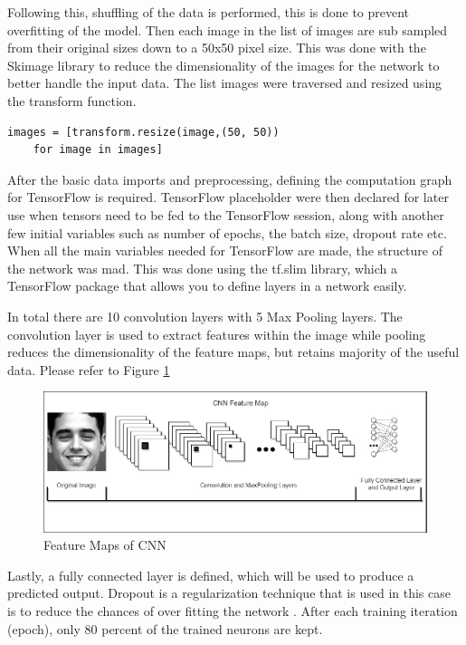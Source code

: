 Following this, shuffling of the data is performed, this is done to prevent overfitting of the model. Then each image in the list of images are sub sampled from their original sizes down to a 50x50 pixel size. This was done with the Skimage library to reduce the dimensionality of the images for the network to better handle the input data. The list images were traversed and resized using the transform function. 
\begin{lstlisting}[frame=single]
images = [transform.resize(image,(50, 50))
	for image in images]
\end{lstlisting}

After the basic data imports and preprocessing, defining the computation graph for TensorFlow is required. TensorFlow placeholder were then declared for later use when tensors need to be fed to the TensorFlow session, along with another few initial variables such as number of epochs, the batch size, dropout rate etc. When all the main variables needed for TensorFlow are made, the structure of the network was mad. This was done using the tf.slim library, which a TensorFlow package that allows you to define layers in a network easily. 

In total there are 10 convolution layers with 5 Max Pooling layers. The convolution layer is used to extract features within the image while pooling reduces the dimensionality of the feature maps, but retains majority of the useful data. Please refer to Figure \ref{map}

\begin{figure}[ht]
	\begin{center}
		\advance\leftskip-3cm
		\advance\rightskip-3cm
		\includegraphics[keepaspectratio=true,scale=0.45]{__resources/implementation/map.jpg}
		\caption{Feature Maps of CNN}
		\label{map}
	\end{center}
\end{figure}

Lastly, a fully connected layer is defined, which will be used to produce a predicted output. Dropout is a regularization technique that is used in this case is to reduce the chances of over fitting the network \citep{JMLR}. After each training iteration (epoch), only 80 percent of the trained neurons are kept.\\ \\

